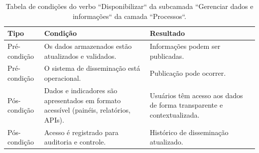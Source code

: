 \begin{apendicesenv}
\begin{table}[H]
\centering
\caption{Tabela de condições do verbo ``Disponibilizar`` da subcamada ``Gerenciar dados e informações`` da camada ``Processos``.}
\begin{tabularx}{\textwidth}{|l|X|X|X|}
\hline
\textbf{Tipo} & \textbf{Condição} & \textbf{Resultado} \\ \hline
Pré-condição & Os dados armazenados estão atualizados e validados. & Informações podem ser publicadas.\\ \hline
Pré-condição & O sistema de disseminação está operacional. & Publicação pode ocorrer.\\ \hline
Pós-condição & Dados e indicadores são apresentados em formato acessível (painéis, relatórios, APIs). & Usuários têm acesso aos dados de forma transparente e contextualizada.\\ \hline
Pós-condição & Acesso é registrado para auditoria e controle. & Histórico de disseminação atualizado.\\ \hline
\end{tabularx}
\end{table}


\end{apendicesenv}
